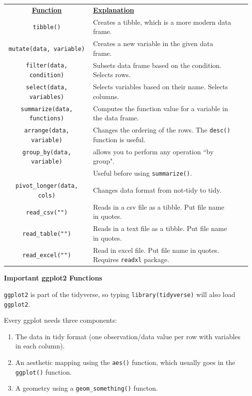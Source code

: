 \documentclass[11pt]{article}
\begin{document}
\begin{longtable}{clcc}
	\underline{\bf Function} & \underline{\bf Explanation}\\
	\texttt{tibble()} & Creates a tibble, which is a more modern data frame.\\
	\texttt{mutate(data, variable)} & Creates a new variable in the given data frame.\\
	\texttt{filter(data, condition)} & Subsets data frame based on the condition. Selects rows.\\
	\texttt{select(data, variables)} & Selects variables based on their name. Selects columns.\\
	\texttt{summarize(data, functions)} & Computes the function value for a variable in the data frame.\\
	\texttt{arrange(data, variable)} & Changes the ordering of the rows. The \texttt{desc()} function is useful.\\
	\texttt{group\_by(data, variable)} & allows you to perform any operation ``by group".\\
	 & Useful before using \texttt{summarize()}.\\
	 \texttt{pivot\_longer(data, cols)} & Changes data format from not-tidy to tidy.\\
	 \texttt{read\_csv("")} & Reads in a csv file as a tibble. Put file name in quotes.\\
	 \texttt{read\_table("")} & Reads in a text file as a tibble. Put file name in quotes.\\
	\texttt{read\_excel("")} & Read in excel file. Put file name in quotes. Requires \texttt{readxl} package.
\end{longtable}


\begin{tcolorbox}[width=2.8in, sharp corners=all, colback=white!95!black] %
	{\bf Important ggplot2 Functions}
\end{tcolorbox}
\texttt{ggplot2} is part of the tidyverse, so typing \texttt{library(tidyverse)} will also load \texttt{ggplot2}.

Every ggplot needs three components: 
\begin{enumerate}
	\item The data in tidy format (one observation/data value per row with variables in each column). 
	\item An aesthetic mapping using the \texttt{aes()} function, which usually goes in the \texttt{ggplot()} function. 
	\item A geometry using a \texttt{geom\_something()} functon.
\end{enumerate}
\end{document}
